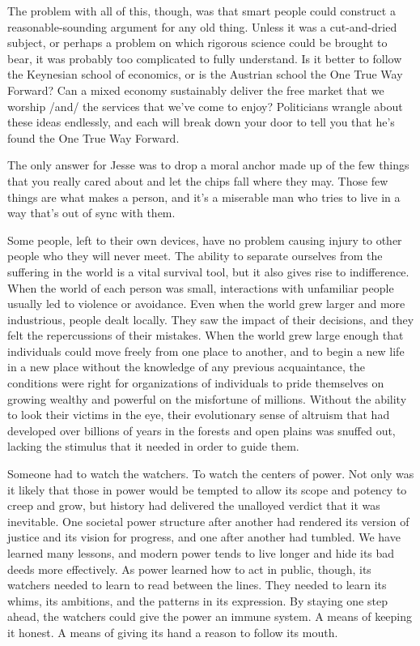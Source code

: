 The problem with all of this, though, was that smart people could construct a reasonable-sounding argument for any old thing.  Unless it was a cut-and-dried subject, or perhaps a problem on which rigorous science could be brought to bear, it was probably too complicated to fully understand.  Is it better to follow the Keynesian school of economics, or is the Austrian school the One True Way Forward?  Can a mixed economy sustainably deliver the free market that we worship /and/ the services that we've come to enjoy?  Politicians wrangle about these ideas endlessly, and each will break down your door to tell you that he's found the One True Way Forward.

The only answer for Jesse was to drop a moral anchor made up of the few things that you really cared about and let the chips fall where they may.  Those few things are what makes a person, and it's a miserable man who tries to live in a way that's out of sync with them.

Some people, left to their own devices, have no problem causing injury to other people who they will never meet.  The ability to separate ourselves from the suffering in the world is a vital survival tool, but it also gives rise to indifference.  When the world of each person was small, interactions with unfamiliar people usually led to violence or avoidance.  Even when the world grew larger and more industrious, people dealt locally.  They saw the impact of their decisions, and they felt the repercussions of their mistakes.  When the world grew large enough that individuals could move freely from one place to another, and to begin a new life in a new place without the knowledge of any previous acquaintance, the conditions were right for organizations of individuals to pride themselves on growing wealthy and powerful on the misfortune of millions.  Without the ability to look their victims in the eye, their evolutionary sense of altruism that had developed over billions of years in the forests and open plains was snuffed out, lacking the stimulus that it needed in order to guide them.

Someone had to watch the watchers.  To watch the centers of power.  Not only was it likely that those in power would be tempted to allow its scope and potency to creep and grow, but history had delivered the unalloyed verdict that it was inevitable.  One societal power structure after another had rendered its version of justice and its vision for progress, and one after another had tumbled.  We have learned many lessons, and modern power tends to live longer and hide its bad deeds more effectively.  As power learned how to act in public, though, its watchers needed to learn to read between the lines.  They needed to learn its whims, its ambitions, and the patterns in its expression.  By staying one step ahead, the watchers could give the power an immune system.  A means of keeping it honest.  A means of giving its hand a reason to follow its mouth.

